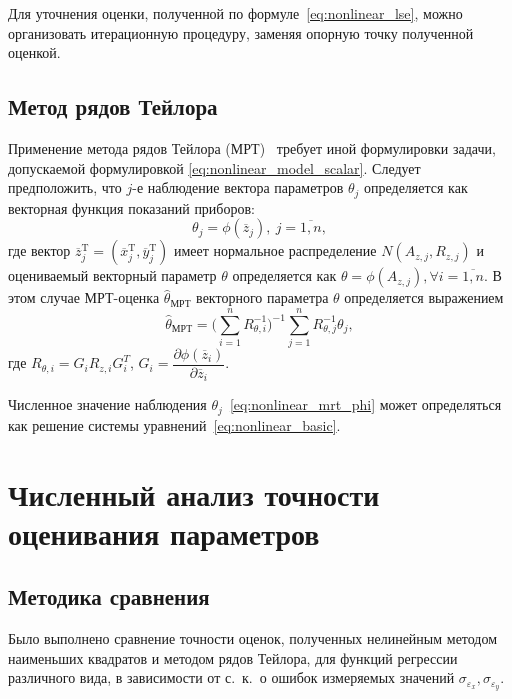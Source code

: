 Для уточнения оценки, полученной по формуле~\eqref{eq:nonlinear_lse}, можно
организовать итерационную процедуру, заменяя опорную точку полученной оценкой.

\vspace{2\baselineskip}
\subsection{Метод рядов Тейлора}

Применение метода рядов Тейлора (МРТ)~\cite{mukha_2000}
требует иной формулировки задачи, допускаемой формулировкой \eqref{eq:nonlinear_model_scalar}.
Следует предположить, что \( j \)-е наблюдение вектора параметров \( \theta_j \)
определяется как векторная функция показаний приборов:
\begin{equation}
  \label{eq:nonlinear_mrt_phi}
  \theta_j = \phi( \overline{z}_{j} ), \: j = \overline{1, n},
\end{equation}
где вектор
\( \overline{z}^{\text{T}}_{j} =
( \overline{x}^{\text{T}}_{j}, \overline{y}^{\text{T}}_{j}) \)
имеет нормальное распределение \( N(A_{z,j}, R_{z,j}) \)
и оцениваемый векторный параметр \( \theta \) определяется как
\( \theta = \phi(A_{z,j}), \forall i = \overline{1, n} \).
В этом случае МРТ-оценка \( \hat{\theta}_{\text{МРТ}} \) векторного параметра \( \theta \)
определяется выражением
\begin{equation}
  \label{eq:nonlinear_mrt}
  \hat{\theta}_{\text{МРТ}} =
  \Bigg( \sum^{n}_{i=1} R^{-1}_{\theta,i} \Bigg)^{-1}
  \sum^{n}_{j=1} R^{-1}_{\theta,j} \theta_j,
\end{equation}
где
\( R_{\theta,i} = G_i R_{z,i} G^T_i \),
\( G_i =
\dfrac{\partial \phi( \overline{z}_{i} ) }{ \partial \overline{z}_{i} } \).

Численное значение наблюдения \( \theta_j \)~\eqref{eq:nonlinear_mrt_phi} может определяться как
решение системы уравнений~\eqref{eq:nonlinear_basic}.


\section{Численный анализ точности оценивания параметров}

\subsection{Методика сравнения}

Было выполнено сравнение точности оценок,
полученных нелинейным методом наименьших квадратов и методом рядов Тейлора,
для функций регрессии различного вида,
в зависимости от с.~к.~о ошибок измеряемых значений
\( \sigma_{\varepsilon_x}, \sigma_{\varepsilon_y} \).

